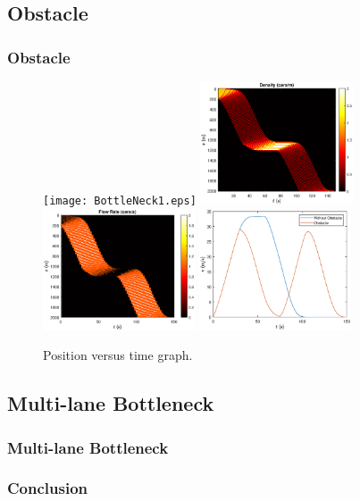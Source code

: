 \documentclass{beamer}
\begin{document}
\subsection{Obstacle}

\begin{frame}
  \frametitle{Obstacle}
  \begin{figure}[H]
    \texttt{[image: BottleNeck1.eps]}
    \includegraphics[width=4.5cm]{BottleNeck5.eps}
    \includegraphics[width=4.5cm]{BottleNeck6.eps}
    \includegraphics[width=4.5cm]{BottleNeck7.eps}
    \caption{Position versus time graph.}
    \label{fig:obstaclePos}
\end{figure}
\end{frame}

\subsection{Multi-lane Bottleneck}

\begin{frame}
  \frametitle{Multi-lane Bottleneck}
\end{frame}

\begin{frame}
  \frametitle{Conclusion}
\end{frame}
\end{document}
